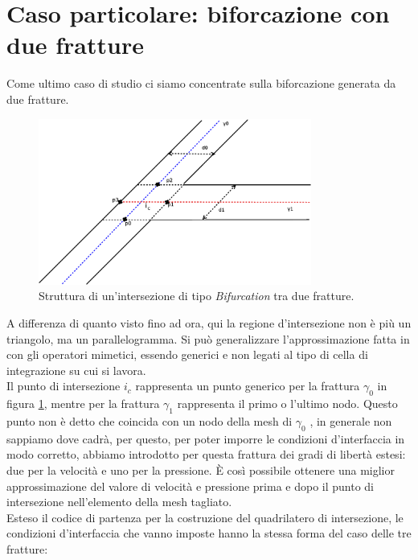\section{Caso particolare: biforcazione con due fratture}

Come ultimo caso di studio ci siamo concentrate sulla biforcazione generata da due fratture. 

\begin{figure}[htbp]
\begin{center}
\includegraphics[width=0.8\textwidth]{img/cap6/y.eps}
\caption{Struttura di un'intersezione di tipo \textit{Bifurcation} tra due fratture.}\label{Y}
\end{center}
\end{figure}

A differenza di quanto visto fino ad ora, qui la regione d'intersezione non è più un triangolo, ma un parallelogramma. Si può generalizzare l'approssimazione fatta in \cite{Paper} con gli operatori mimetici, essendo generici e non legati al tipo di cella di integrazione su cui si lavora. \\
\noindent Il punto di intersezione $i_c$ rappresenta un punto generico per la frattura $\gamma_0$ in figura \ref{Y}, mentre per la frattura $\gamma_1$ rappresenta il primo o l'ultimo nodo. Questo punto non è detto che coincida con un nodo della mesh di $\gamma_0$ , in generale non sappiamo dove cadrà, per questo, per poter imporre le condizioni d'interfaccia in modo corretto, abbiamo introdotto per questa frattura dei gradi di libertà estesi: due per la velocità e uno per la pressione. È così possibile ottenere una miglior approssimazione del valore di velocità e pressione prima e dopo il punto di intersezione nell'elemento della mesh tagliato. \\
Esteso il codice di partenza per la costruzione del quadrilatero di intersezione, le condizioni d'interfaccia che vanno imposte hanno la stessa forma del caso delle tre fratture:

